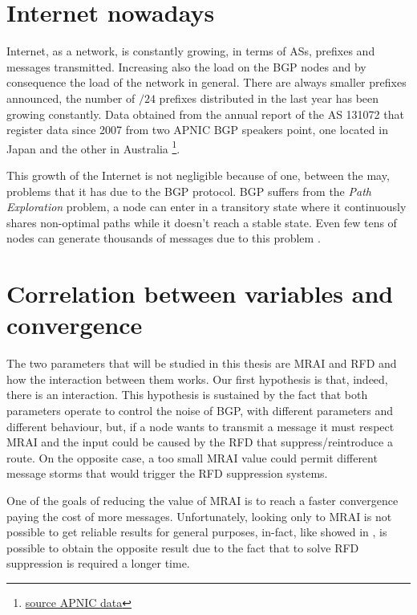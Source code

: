 \section{Internet nowadays}
\label{sec:internet_today}

Internet, as a network, is constantly growing, in terms of \acp{AS}, prefixes
and messages transmitted.
Increasing also the load on the \ac{BGP} nodes and by consequence the load
of the network in general.
There are always smaller prefixes announced, the number of $/24$ prefixes
distributed in the last year has been growing constantly.
Data obtained from the annual report of the \ac{AS} 131072 that register data
since \num{2007} from two APNIC \ac{BGP} speakers point, one located in Japan
and the other in Australia \footnote{\href{https://blog.apnic.net/2021/01/05/bgp-in-2020-the-bgp-table/}{source APNIC data}}.

This growth of the Internet is not negligible because of one, between the may, 
problems that it has due to the \ac{BGP} protocol.
\ac{BGP} suffers from the \textit{Path Exploration} problem, a node can enter in 
a transitory state where it continuously shares non-optimal paths while it
doesn't reach a stable state.
Even few tens of nodes can generate thousands of messages due to this problem 
\cite{deshpande2004impact}.

\section{Correlation between variables and convergence}
\label{sec:bgp_correlations}

The two parameters that will be studied in this thesis are \ac{MRAI} and \ac{RFD}
and how the interaction between them works.
Our first hypothesis is that, indeed, there is an interaction.
This hypothesis is sustained by the fact that both parameters operate to 
control the noise of \ac{BGP}, with different parameters and different behaviour,
but, if a node wants to transmit a message it must respect \ac{MRAI} and the input
could be caused by the \ac{RFD} that suppress/reintroduce a route. 
On the opposite case, a too small \ac{MRAI} value could permit different message
storms that would trigger the \ac{RFD} suppression systems.

One of the goals of reducing the value of \ac{MRAI} is to reach a faster convergence
paying the cost of more messages.
Unfortunately, looking only to \ac{MRAI} is not possible to get reliable results
for general purposes, in-fact, like showed in , is possible 
to obtain the opposite result due to the fact that to solve \ac{RFD} suppression
is required a longer time.

